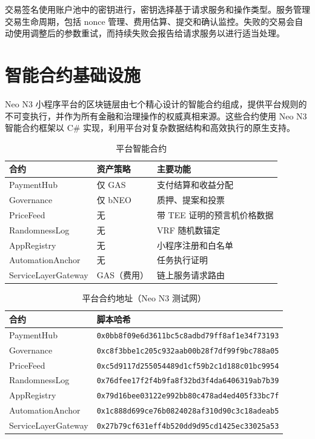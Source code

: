 \documentclass[11pt,a4paper]{article}
\begin{document}
交易签名使用账户池中的密钥进行，密钥选择基于请求服务和操作类型。服务管理交易生命周期，包括 nonce 管理、费用估算、提交和确认监控。失败的交易会自动使用调整后的参数重试，而持续失败会报告给请求服务以进行适当处理。

\section{智能合约基础设施}

Neo N3 小程序平台的区块链层由七个精心设计的智能合约组成，提供平台规则的不可变执行，并作为所有金融和治理操作的权威真相来源。这些合约使用 Neo N3 智能合约框架以 C\# 实现，利用平台对复杂数据结构和高效执行的原生支持。

\begin{table}[h]
\centering
\caption{平台智能合约}
\begin{tabular}{@{}llp{5.5cm}@{}}
\toprule
\textbf{合约} & \textbf{资产策略} & \textbf{主要功能} \\
\midrule
PaymentHub & 仅 GAS & 支付结算和收益分配 \\
Governance & 仅 bNEO & 质押、提案和投票 \\
PriceFeed & 无 & 带 TEE 证明的预言机价格数据 \\
RandomnessLog & 无 & VRF 随机数锚定 \\
AppRegistry & 无 & 小程序注册和白名单 \\
AutomationAnchor & 无 & 任务执行证明 \\
ServiceLayerGateway & GAS（费用） & 链上服务请求路由 \\
\bottomrule
\end{tabular}
\label{tab:smart-contracts}
\end{table}

\begin{table}[h]
\centering
\caption{平台合约地址（Neo N3 测试网）}
\begin{tabular}{@{}ll@{}}
\toprule
\textbf{合约} & \textbf{脚本哈希} \\
\midrule
PaymentHub & \texttt{0x0bb8f09e6d3611bc5c8adbd79ff8af1e34f73193} \\
Governance & \texttt{0xc8f3bbe1c205c932aab00b28f7df99f9bc788a05} \\
PriceFeed & \texttt{0xc5d9117d255054489d1cf59b2c1d188c01bc9954} \\
RandomnessLog & \texttt{0x76dfee17f2f4b9fa8f32bd3f4da6406319ab7b39} \\
AppRegistry & \texttt{0x79d16bee03122e992bb80c478ad4ed405f33bc7f} \\
AutomationAnchor & \texttt{0x1c888d699ce76b0824028af310d90c3c18adeab5} \\
ServiceLayerGateway & \texttt{0x27b79cf631eff4b520dd9d95cd1425ec33025a53} \\
\bottomrule
\end{tabular}
\label{tab:platform-contracts-addresses}
\end{table}
\end{document}
